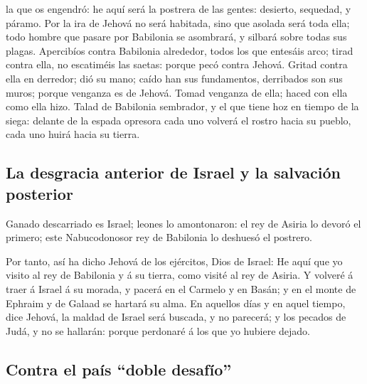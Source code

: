 la que os engendró: he aquí será la postrera de las gentes: desierto,
sequedad, y páramo.  Por la ira de Jehová no será habitada,
sino que asolada será toda ella; todo hombre que pasare por Babilonia se
asombrará, y silbará sobre todas sus plagas.  Apercibíos
contra Babilonia alrededor, todos los que entesáis arco; tirad contra
ella, no escatiméis las saetas: porque pecó contra Jehová. 
Gritad contra ella en derredor; dió su mano; caído han sus fundamentos,
derribados son sus muros; porque venganza es de Jehová. Tomad venganza
de ella; haced con ella como ella hizo.  Talad de Babilonia
sembrador, y el que tiene hoz en tiempo de la siega: delante de la
espada opresora cada uno volverá el rostro hacia su pueblo, cada uno
huirá hacia su tierra.

\hypertarget{la-desgracia-anterior-de-israel-y-la-salvaciuxf3n-posterior}{%
\subsection{La desgracia anterior de Israel y la salvación
posterior}\label{la-desgracia-anterior-de-israel-y-la-salvaciuxf3n-posterior}}

 Ganado descarriado es Israel; leones lo amontonaron: el
rey de Asiria lo devoró el primero; este Nabucodonosor rey de Babilonia
lo deshuesó el postrero.

 Por tanto, así ha dicho Jehová de los ejércitos, Dios de
Israel: He aquí que yo visito al rey de Babilonia y á su tierra, como
visité al rey de Asiria.  Y volveré á traer á Israel á su
morada, y pacerá en el Carmelo y en Basán; y en el monte de Ephraim y de
Galaad se hartará su alma.  En aquellos días y en aquel
tiempo, dice Jehová, la maldad de Israel será buscada, y no parecerá; y
los pecados de Judá, y no se hallarán: porque perdonaré á los que yo
hubiere dejado.

\hypertarget{contra-el-pauxeds-doble-desafuxedo}{%
\subsection{Contra el país ``doble
desafío''}\label{contra-el-pauxeds-doble-desafuxedo}}

